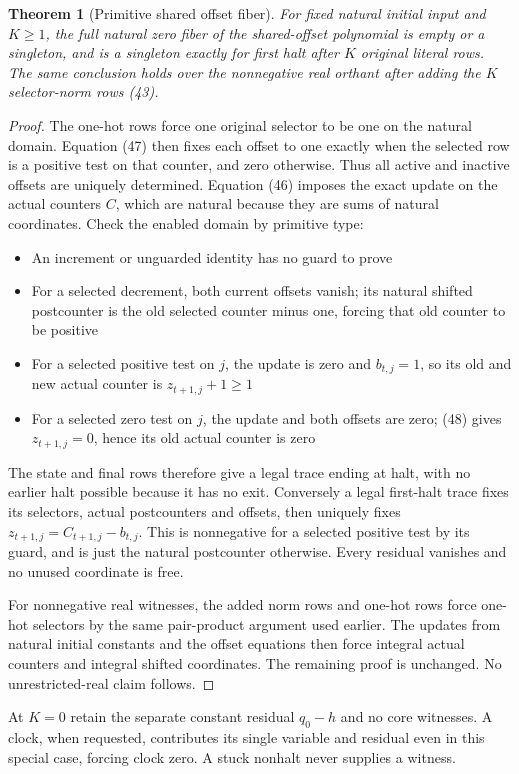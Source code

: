 \documentclass[11pt,a4paper]{article}
\numberwithin{equation}{section}
\newtheorem{theorem}{Theorem}[section]
\begin{document}
\begin{theorem}[Primitive shared offset fiber]\label{fpa:ls:thm:direct}
For fixed natural initial input and $K\ge1$, the full natural zero fiber of
the shared-offset polynomial is empty or a singleton, and is a singleton
exactly for first halt after $K$ original literal rows. The same conclusion
holds over the nonnegative real orthant after adding the $K$ selector-norm
rows (43).
\end{theorem}
\begin{proof}
The one-hot rows force one original selector to be one on the natural
domain. Equation (47) then fixes each offset to one exactly when the
selected row is a positive test on that counter, and zero otherwise. Thus
all active and inactive offsets are uniquely determined. Equation (46)
imposes the exact update on the actual counters $C$, which are natural
because they are sums of natural coordinates. Check the enabled domain by
primitive type:
\begin{itemize}
\item An increment or unguarded identity has no guard to prove
\item For a selected decrement, both current offsets vanish; its natural
shifted postcounter is the old selected counter minus one, forcing that old
counter to be positive
\item For a selected positive test on $j$, the update is zero and
$b_{t,j}=1$, so its old and new actual counter is $z_{t+1,j}+1\ge1$
\item For a selected zero test on $j$, the update and both offsets are zero;
(48) gives $z_{t+1,j}=0$, hence its old actual counter is zero
\end{itemize}
The state and final rows therefore give a legal trace ending at halt, with
no earlier halt possible because it has no exit. Conversely a legal
first-halt trace fixes its selectors, actual postcounters and offsets, then
uniquely fixes $z_{t+1,j}=C_{t+1,j}-b_{t,j}$. This is nonnegative for a
selected positive test by its guard, and is just the natural postcounter
otherwise. Every residual vanishes and no unused coordinate is free.

For nonnegative real witnesses, the added norm rows and one-hot rows force
one-hot selectors by the same pair-product argument used earlier. The
updates from natural initial constants and the offset equations then force
integral actual counters and integral shifted coordinates. The remaining
proof is unchanged. No unrestricted-real claim follows.
\end{proof}
At $K=0$ retain the separate constant residual $q_0-h$ and no core witnesses.
A clock, when requested, contributes its single variable and residual even
in this special case, forcing clock zero. A stuck nonhalt never supplies a
witness.
\end{document}
